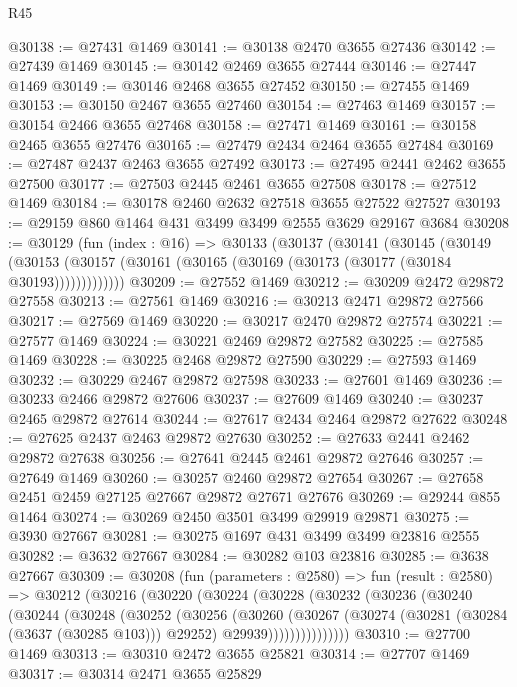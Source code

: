 \begin{lexlean}{R45}
\begin{coremodule}
@30138 := @27431 @1469
@30141 := @30138 @2470 @3655 @27436
@30142 := @27439 @1469
@30145 := @30142 @2469 @3655 @27444
@30146 := @27447 @1469
@30149 := @30146 @2468 @3655 @27452
@30150 := @27455 @1469
@30153 := @30150 @2467 @3655 @27460
@30154 := @27463 @1469
@30157 := @30154 @2466 @3655 @27468
@30158 := @27471 @1469
@30161 := @30158 @2465 @3655 @27476
@30165 := @27479 @2434 @2464 @3655 @27484
@30169 := @27487 @2437 @2463 @3655 @27492
@30173 := @27495 @2441 @2462 @3655 @27500
@30177 := @27503 @2445 @2461 @3655 @27508
@30178 := @27512 @1469
@30184 := @30178 @2460 @2632 @27518 @3655 @27522 @27527
@30193 := @29159 @860 @1464 @431 @3499 @3499 @2555 @3629 @29167 @3684
@30208 := @30129
    (fun (index : @16) =>
    @30133
      (@30137
        (@30141
          (@30145
            (@30149
              (@30153 (@30157 (@30161 (@30165 (@30169 (@30173 (@30177 (@30184 @30193)))))))))))))
@30209 := @27552 @1469
@30212 := @30209 @2472 @29872 @27558
@30213 := @27561 @1469
@30216 := @30213 @2471 @29872 @27566
@30217 := @27569 @1469
@30220 := @30217 @2470 @29872 @27574
@30221 := @27577 @1469
@30224 := @30221 @2469 @29872 @27582
@30225 := @27585 @1469
@30228 := @30225 @2468 @29872 @27590
@30229 := @27593 @1469
@30232 := @30229 @2467 @29872 @27598
@30233 := @27601 @1469
@30236 := @30233 @2466 @29872 @27606
@30237 := @27609 @1469
@30240 := @30237 @2465 @29872 @27614
@30244 := @27617 @2434 @2464 @29872 @27622
@30248 := @27625 @2437 @2463 @29872 @27630
@30252 := @27633 @2441 @2462 @29872 @27638
@30256 := @27641 @2445 @2461 @29872 @27646
@30257 := @27649 @1469
@30260 := @30257 @2460 @29872 @27654
@30267 := @27658 @2451 @2459 @27125 @27667 @29872 @27671 @27676
@30269 := @29244 @855 @1464
@30274 := @30269 @2450 @3501 @3499 @29919 @29871
@30275 := @3930 @27667
@30281 := @30275 @1697 @431 @3499 @3499 @23816 @2555
@30282 := @3632 @27667
@30284 := @30282 @103 @23816
@30285 := @3638 @27667
@30309 := @30208
    (fun (parameters : @2580) =>
    fun (result : @2580) =>
    @30212
      (@30216
        (@30220
          (@30224
            (@30228
              (@30232
                (@30236
                  (@30240
                    (@30244
                      (@30248
                        (@30252
                          (@30256
                            (@30260
                              (@30267
                                (@30274
                                  (@30281 (@30284 (@3637 (@30285 @103))) @29252)
                                  @29939)))))))))))))))
@30310 := @27700 @1469
@30313 := @30310 @2472 @3655 @25821
@30314 := @27707 @1469
@30317 := @30314 @2471 @3655 @25829

\end{coremodule}
\end{lexlean}
